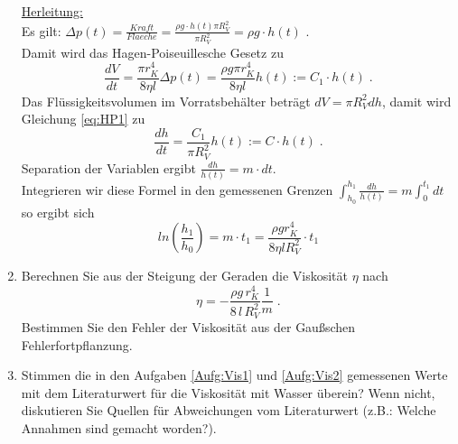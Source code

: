 \begin{enumerate}
	\underline{Herleitung:}\\
	Es gilt: $\Delta p(t) = \frac{Kraft}{Flaeche} = \frac{\rho g\cdot h(t) \pi R_V^2}{\pi R_V^2} = \rho g\cdot h(t)$\; .\\
	Damit wird das Hagen-Poiseuillesche Gesetz zu 
	\begin{equation} \label{eq:HP1}
		\frac{dV}{dt} = \frac{\pi r_K^4}{8\eta l}\Delta p(t) = \frac{\rho g\pi r_K^4}{8\eta l} h(t) := C_1\cdot h(t)\; .
	\end{equation}
	Das Flüssigkeitsvolumen im Vorratsbehälter beträgt $dV = \pi R_V^2 dh$, damit wird Gleichung \ref{eq:HP1} zu
	\begin{equation}
		\frac{dh}{dt} = \frac{C_1}{\pi R_V^2} h(t) := C\cdot h(t)\; .
	\end{equation}
	Separation der Variablen ergibt $\frac{dh}{h(t)} = m\cdot dt$.\\
	Integrieren wir diese Formel in den gemessenen Grenzen $\int^{h_1}_{h_0} \frac{dh}{h(t)} = m\int^{t_1}_0 dt$\\
	so ergibt sich
	\begin{equation}
		ln\left(\frac{h_1}{h_0}\right) = m\cdot t_1 = \frac{\rho g r_K^4}{8\eta l R_V^2}\cdot t_1
	\end{equation}
 \item \label{Aufg:Vis2}
 Berechnen Sie aus der Steigung der Geraden die Viskosität $\eta$ nach
  \begin{equation}
   \eta = -\frac{\rho g\,r_K^4}{8\,l\,R^2_V}\frac{1}{m}\; .
  \end{equation}
 Bestimmen Sie den Fehler der Viskosität aus der Gaußschen Fehlerfortpflanzung.
 \item Stimmen die in den Aufgaben \ref{Aufg:Vis1} und \ref{Aufg:Vis2} gemessenen Werte mit dem Literaturwert für die Viskosität mit Wasser überein? Wenn nicht, diskutieren Sie Quellen für Abweichungen vom Literaturwert (z.B.: Welche Annahmen sind gemacht worden?).
\end{enumerate}